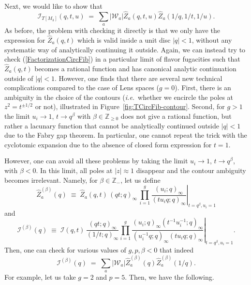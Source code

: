 \documentclass[hyper,letterpaper]{JHEP3}
\newcommand{\Z}{{\mathbb Z}}
\renewcommand{\hat}{\widehat}
\def\CI{{\mathcal I}}
\def\CW{{\mathcal W}}
\def\ie{{\textit{i.e.}}}
\begin{document}
Next, we would like to show that
\begin{equation}
	\CI_{T[M_3]}(q,t,u) \; = \; \sum_{a}|\CW_a|\hat{Z}_a(q,t,u)\hat{Z}_a(1/q,1/t,1/u).
	\label{FactorizationCircFib}
\end{equation}
As before, the problem with checking it directly is that we only have the expression for $\hat{Z}_a(q,t)$ which is valid inside a unit disc $|q|<1$, without any systematic way of analytically continuing it outside. Again, we can instead try to check (\ref{FactorizationCircFib}) in a particular limit of flavor fugacities such that $\hat{Z}_a(q,t)$ becomes a rational function and has canonical analytic continuation outside of $|q|<1$. However, one finds that there are several new technical complications compared to the case of Lens spaces ($g=0$). First, there is an ambiguity in the choice of the contours (\ie~whether we encircle the poles at $z^2=t^{\pm1/2}$ or not), illustrated in Figure~\ref{fig:TCircFib-contour}. Second,
for $g>1$ the limit $u_i\rightarrow 1$, $t\rightarrow q^{\beta}$ with $\beta\in \Z_{\geq 0}$ does not give a rational function, but rather a lacunary function that cannot be analytically continued outside $|q|<1$ due to the Fabry gap theorem.
In particular, one cannot repeat the trick with the cyclotomic expansion due to the absence of closed form expression for $t=1$.

However, one can avoid all these problems by taking the limit $u_i\rightarrow 1$, $t\rightarrow q^\beta$, with $\beta<0$.
In this limit, all poles at $|z|\approx 1$ disappear and the contour ambiguity becomes irrelevant.
Namely, for $\beta\in\Z_{-}$, let us define
\begin{equation} \hat{Z}_a^{(\beta)}(q) \; \equiv \; \left.\hat{Z}_a(q,t)\,(qt;q)_\infty\,\prod_{i=1}^g\frac{(u_i;q)_\infty}{(tu_iq;q)_\infty}\right|_{t=q^{\beta},u_i=1}
\end{equation}
and
\begin{equation}
	\CI^{(\beta)}(q) \; \equiv \; \left.\CI(q,t)\,\frac{(qt;q)_\infty}{(1/t;q)_\infty}
	\prod_{i=1}^g\frac{(u_i;q)_\infty(t^{-1}u_i^{-1};q)_\infty}{(u_i^{-1}q;q)_\infty(tu_iq;q)_\infty}
	\right|_{t=q^{\beta},u_i=1}.
\end{equation}
Then, one can check for various values of $g,p,\beta<0$ that indeed
\begin{equation}
	\CI^{(\beta)}(q) \; = \; \sum_a|\CW_a|\hat{Z}_a^{(\beta)}(q)\hat{Z}_a^{(\beta)}(1/q).
\end{equation}
For example, let us take $g=2$ and $p=5$. Then, we have the following.
\end{document}
